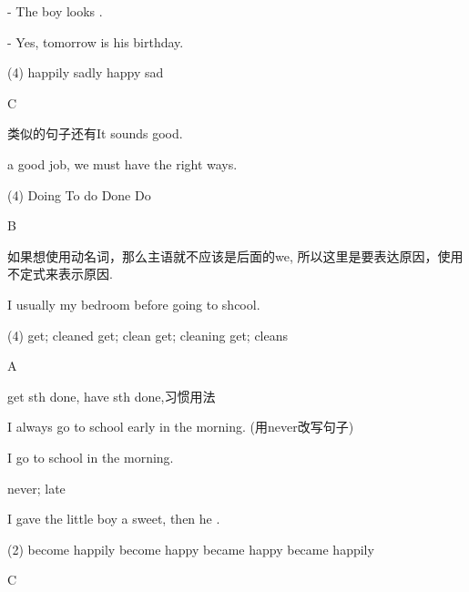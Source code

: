\begin{question}[tags={xiaoxuect}]
- The boy looks \blank[width=1cm]{}.

\noindent - Yes, tomorrow is his birthday.

  \begin{tasks}(4)
    \task happily
    \task sadly
    \task happy
    \task sad
  \end{tasks}
\end{question}
\begin{solution}
C

类似的句子还有It sounds good.
\end{solution}

\begin{question}[tags={xiaoxuect}]
\blank*[width=1cm]{} a good job, we must have the right ways.

  \begin{tasks}(4)
    \task Doing
    \task To do
    \task Done
    \task Do
  \end{tasks}
\end{question}
\begin{solution}
B

如果想使用动名词，那么主语就不应该是后面的we, 所以这里是要表达原因，使用不定式来表示原因.
\end{solution}

\begin{question}[tags={xiaoxuect}]
I usually \blank[width=1cm]{} my bedroom \blank[width=1cm]{} before going to shcool.

  \begin{tasks}(4)
    \task get; cleaned
    \task get; clean
    \task get; cleaning
    \task get; cleans
  \end{tasks}
\end{question}
\begin{solution}
A

get sth done, have sth done,习惯用法
\end{solution}

\begin{question}[tags={xiaoxuect}]
I always go to school early in the morning. (用never改写句子)

\noindent I \blank[width=1cm]{} go to school \blank[width=1cm]{} in the morning.

\end{question}
\begin{solution}
never; late
\end{solution}

\begin{question}[tags={xiaoxuect}]
I gave the little boy a sweet, then he \blank[width=1cm]{}.

  \begin{tasks}(2)
    \task become happily
    \task become happy
    \task became happy
    \task became happily
  \end{tasks}

\end{question}
\begin{solution}
C
\end{solution}


